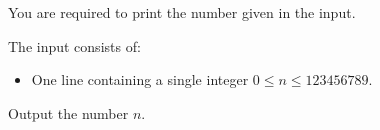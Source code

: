 \problemname{}


\newcommand{\maxn}{123456789}

You are required to print the number given in the input.

\begin{Input}
	The input consists of:
	\begin{itemize}
		\item One line containing a single integer $0\leq n\leq \maxn$.
	\end{itemize}
\end{Input}

\begin{Output}
	Output the number $n$.
\end{Output}

